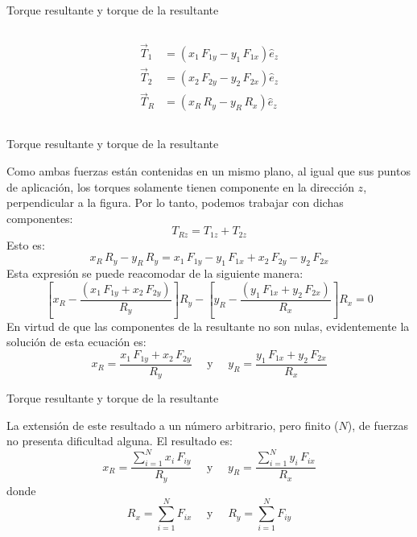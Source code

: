 \documentclass[11pt,handout,aspectratio=1610]{beamer}
\begin{document}
\begin{frame}{Torque resultante y torque de la resultante}
\begin{columns}
\begin{column}{0.6\textwidth}
            \begin{align*}
                \vec{T}_1 &= \left(x_1 \, F_{1y} - y_1 \, F_{1x}\right) \hat{e}_z \\
                \vec{T}_2 &= \left(x_2 \, F_{2y} - y_2 \, F_{2x}\right) \hat{e}_z \\
                \vec{T}_R &= \left(x_R \, R_{y} - y_R \, R_{x}\right) \hat{e}_z
            \end{align*}
        \end{column}
    \end{columns}
    
\end{frame}

\begin{frame}{Torque resultante y torque de la resultante}

    Como ambas fuerzas están contenidas en un mismo plano, al igual que sus puntos de aplicación, los torques solamente tienen componente en la dirección $z$, perpendicular a la figura. Por lo tanto, podemos trabajar con dichas componentes: $$ T_{Rz} = T_{1z} + T_{2z} $$ Esto es: $$x_R \, R_{y} - y_R \, R_{y} = x_1 \, F_{1y} - y_1 \, F_{1x} + x_2 \, F_{2y} - y_2 \, F_{2x} $$ Esta expresión se puede reacomodar de la siguiente manera: $$ \left[x_R - \frac{\left(x_1 \, F_{1y} + x_2 \, F_{2y}\right)}{R_y}\right] R_y - \left[y_R - \frac{\left(y_1 \, F_{1x} + y_2 \, F_{2x}\right)}{R_x}\right] R_x = 0 $$ En virtud de que las componentes de la resultante no son nulas, evidentemente la solución de esta ecuación es: $$ x_R = \frac{x_1 \, F_{1y} + x_2 \, F_{2y}}{R_y} \quad \text{ y } \quad y_R = \frac{y_1 \, F_{1x} + y_2 \, F_{2x}}{R_x} $$
    
\end{frame}

\begin{frame}{Torque resultante y torque de la resultante}

    La extensión de este resultado a un número arbitrario, pero finito ($N$), de fuerzas no presenta dificultad alguna. El resultado es: $$ x_R = \frac{\sum\limits_{i=1}^{N} x_i \, F_{iy}}{R_y} \quad \text{ y } \quad y_R = \frac{\sum\limits_{i=1}^{N} y_i \, F_{ix}}{R_x} $$ donde $$ R_x = \sum_{i=1}^{N} F_{ix} \quad \text{ y } \quad R_y = \sum_{i=1}^{N} F_{iy} $$
    
\end{frame}
\end{document}
